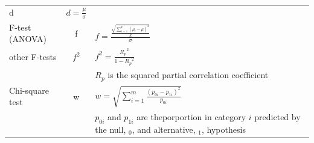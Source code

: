 \documentclass[
  12pt,
]{book}
\begin{document}
\begin{longtable}[]{@{}lcl@{}}
\begin{minipage}[t]{0.35\columnwidth}
d\strut
\end{minipage} & \begin{minipage}[t]{0.46\columnwidth}\raggedright
\(d = \frac{\mu}{\sigma}\)\strut
\end{minipage}\tabularnewline
\begin{minipage}[t]{0.11\columnwidth}\raggedright
F-test (ANOVA)\strut
\end{minipage} & \begin{minipage}[t]{0.35\columnwidth}\centering
f\strut
\end{minipage} & \begin{minipage}[t]{0.46\columnwidth}\raggedright
\(f = \frac{\frac{\sqrt{\sum_{i=1}^k (\mu_i - \mu)^2}}{k}}{\sigma}\)\strut
\end{minipage}\tabularnewline
\begin{minipage}[t]{0.11\columnwidth}\raggedright
other F-tests\strut
\end{minipage} & \begin{minipage}[t]{0.35\columnwidth}\centering
\(f^2\)\strut
\end{minipage} & \begin{minipage}[t]{0.46\columnwidth}\raggedright
\(f^2 = \frac{{R_p}^2}{1-{R_p}^2}\)\strut
\end{minipage}\tabularnewline
\begin{minipage}[t]{0.11\columnwidth}\raggedright
\strut
\end{minipage} & \begin{minipage}[t]{0.35\columnwidth}\centering
\strut
\end{minipage} & \begin{minipage}[t]{0.46\columnwidth}\raggedright
\({R_p}\) is the squared partial correlation coefficient\strut
\end{minipage}\tabularnewline
\begin{minipage}[t]{0.11\columnwidth}\raggedright
Chi-square test\strut
\end{minipage} & \begin{minipage}[t]{0.35\columnwidth}\centering
w\strut
\end{minipage} & \begin{minipage}[t]{0.46\columnwidth}\raggedright
\(w = \sqrt{ \sum_{i=1}^m \frac{(p_{0i} - p_{1i})^2 }{ p_{0i}} }\)\strut
\end{minipage}\tabularnewline
\begin{minipage}[t]{0.11\columnwidth}\raggedright
\strut
\end{minipage} & \begin{minipage}[t]{0.35\columnwidth}\centering
\strut
\end{minipage} & \begin{minipage}[t]{0.46\columnwidth}\raggedright
\(p_{0i}\) and \(p_{1i}\) are theporportion in category \(i\) predicted by the null, \(_0\), and alternative, \(_1\), hypothesis\strut
\end{minipage}\tabularnewline
\bottomrule
\end{longtable}
\end{document}

